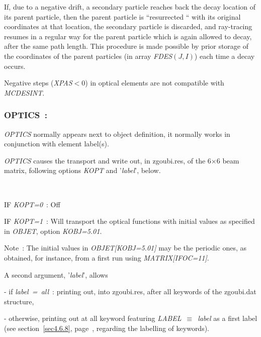 \noindent If, due   to  a  negative  drift,   a  secondary  particle  reaches 
back the  decay location of its parent particle, then 
the parent  particle  is  ``resurrected `` with its original coordinates 
at  that  location, the   secondary   particle   is   discarded, and 
ray-tracing  resumes  in  a  regular way  for the parent  particle which  
is again allowed to decay,  after  the  same path length. This  procedure  is made 
possible  by  prior storage  of  the  coordinates of the parent  
particles (in array \textsl{FDES}$(J,I)$) each  time  a  decay  occurs. 

\noindent Negative steps (\textsl{XPAS}$<0$) in
optical elements are not compatible with  \textsl{MCDESINT}.  







\newpage

\subsubsection*{OPTICS~: \OPTICSTitl} \label{OPTICS} 

\medskip

\textsl{OPTICS}  normally appears next to object definition, it normally works in conjunction with 
element label(s). 

\noindent \textsl{OPTICS}  causes the transport and  write out, in zgoubi.res, of the 6$\times$6 beam matrix, 
following options \textsl{KOPT} and '\textsl{label}', below. 

~

\noindent IF \textsl{KOPT=0}~: Off

\noindent IF \textsl{KOPT=1}~: Will transport the optical functions with initial values as specified in \textsl{OBJET}, option 
 \textsl{KOBJ=5.01}. 

\medskip

\noindent  Note~:  The initial values  in \textsl{OBJET[KOBJ=5.01]} may be the periodic ones, as obtained, for instance, from a first run using \textsl{MATRIX[IFOC=11]}. 

\bigskip

\noindent A second argument,  '\textsl{label}',  allows 

- if \textsl{label~=~all}~: printing out, into zgoubi.res, after all keywords of the zgoubi.dat structure, 

- otherwise, printing out at all keyword featuring 
\textsl{LABEL}~$\equiv$~\textsl{label} as a first label  (see section~\ref{sec4.6.8}, page~\pageref{sec4.6.8}, regarding  
the labelling of keywords).


